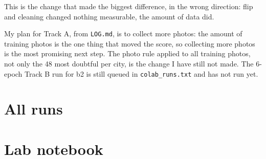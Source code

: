 \documentclass[11pt]{article}
\begin{document}
This is the change that made the biggest difference, in the wrong direction:
flip and cleaning changed nothing measurable, the amount of data did.

My plan for Track A, from \texttt{LOG.md}, is to collect more photos: the amount
of training photos is the one thing that moved the score, so collecting more
photos is the most promising next step. The photo rule applied to all training
photos, not only the 48 most doubtful per city, is the change I have still not
made. The 6-epoch Track B run for b2 is still queued in \texttt{colab\_runs.txt}
and has not run yet.

\section*{All runs}

\section*{Lab notebook}
\end{document}
